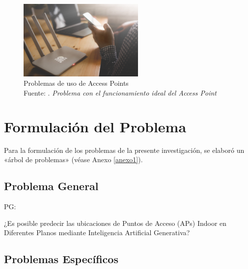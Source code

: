 \begin{figure}[h]
	\begin{center}
		\includegraphics[width=0.55\textwidth]{1/figures/access-point-1.jpeg}
		\caption[Problemas de uso de Access Points]{Problemas de uso de Access Points\\
		Fuente: \cite{cr_hustle2019successrate}. \textit{Problema con el funcionamiento ideal del Access Point}}
		\label{1:fig2}
	\end{center}
\end{figure}

\section{Formulación del Problema}
Para la formulación de los problemas de la presente investigación, se elaboró un «árbol de problemas» (véase Anexo \ref{anexo1}).

\subsection{Problema General}
PG: \newcommand{\ProblemaGeneral}{
¿Es posible predecir las ubicaciones de Puntos de Acceso (APs) Indoor en Diferentes Planos  mediante Inteligencia Artificial Generativa?
}
\ProblemaGeneral
\subsection{Problemas Específicos}
\newcommand{\Pbone}{
¿Cómo se puede modelar de manera efectiva la distribución espacial de usuarios y obstáculos en un entorno interior para predecir la cobertura inalámbrica?
}
\newcommand{\Pbtwo}{
¿Qué enfoques de inteligencia artificial generativa, como redes generativas adversarias (GANs) o modelos de generación de texto, son más adecuados para generar ubicaciones óptimas de APs en entornos interiores?
}
\newcommand{\Pbthree}{
¿Qué estrategias de optimización se pueden aplicar para ajustar dinámicamente los recursos, como la potencia de transmisión y la capacidad de los APs, con el fin de mejorar la calidad de la cobertura inalámbrica?
}
\newcommand{\Pbfour}{
¿Cómo se pueden equilibrar eficientemente los recursos asignados a diferentes APs para garantizar una cobertura uniforme y una distribución equitativa de la capacidad de red?
}

